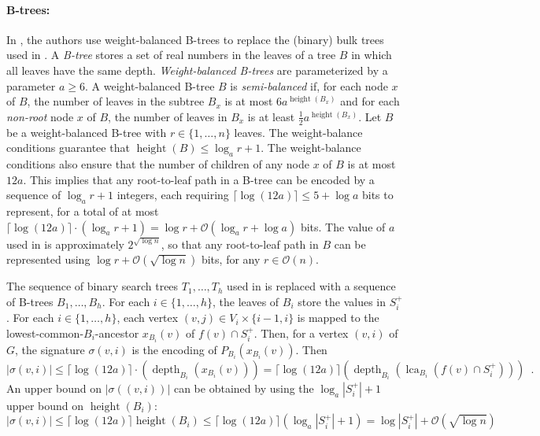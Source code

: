 \documentclass{patmorin}
\renewcommand{\ge}{\geqslant}
\renewcommand{\le}{\leqslant}
\newcommand{\pat}[1]{\noindent\textcolor{Magenta}{PaMo: #1}}
\newcommand{\defin}[1]{\emph{\textcolor{brightmaroon}{#1}}}
\DeclareMathOperator{\height}{height}
\DeclareMathOperator{\depth}{depth}
\DeclareMathOperator{\lca}{lca}
\newcommand{\Oh}{\mathcal{O}}
\begin{document}
  \paragraph{B-trees:} 
  In \cite{gawrychowski.janczewski:simpler}, the authors use weight-balanced B-trees to replace the (binary) bulk trees used in \cite{dujmovic.esperet.ea:adjacency}.
  A \defin{B-tree} stores a set of real numbers in the leaves of a tree $B$ in which all leaves have the same depth.
  \defin{Weight-balanced B-trees} are parameterized by a parameter $a\ge 6$.  A weight-balanced B-tree $B$ is \defin{semi-balanced} if, for each node $x$ of $B$, the number of leaves in the subtree $B_x$ is at most $6a^{\height(B_x)}$ and for each \emph{non-root} node $x$ of $B$, the number of leaves in $B_x$ is at least $\tfrac{1}{2}a^{\height(B_x)}$.
  Let $B$ be a weight-balanced B-tree with $r\in \{1,\ldots,n\}$ leaves.  The weight-balance conditions guarantee that $\height(B)\le \log_a r + 1$.
  The weight-balance conditions also ensure that the number of children of any node $x$ of $B$ is at most $12a$.
  This implies that any root-to-leaf path in a B-tree can be encoded by a sequence of $\log_a r+1$ integers, each requiring $\lceil\log(12a)\rceil\le 5+\log a$ bits to represent, for a total of at most $\lceil\log(12a)\rceil\cdot(\log_a r+1)=\log r + \Oh(\log_a r + \log a)$ bits.
  The value of $a$ used in \cite{gawrychowski.janczewski:simpler} is approximately $2^{\sqrt{\log n}}$, so that any root-to-leaf path in $B$ can be represented using $\log r + \Oh(\sqrt{\log n})$ bits, for any $r\in\Oh(n)$.


  The sequence of binary search trees $T_1,\ldots,T_h$ used in \cite{gawrychowski.janczewski:simpler} is replaced with a sequence of B-trees $B_1,\ldots,B_h$.
  For each $i\in\{1,\ldots,h\}$, the leaves of $B_i$ store the values in $S^+_i$.
  For each $i\in\{1,\ldots,h\}$, each vertex $(v,j)\in V_i\times\{i-1,i\}$ is mapped to the lowest-common-$B_i$-ancestor $x_{B_i}(v)$ of $f(v)\cap S^+_i$.
  Then, for a vertex $(v,i)$ of $G$, the signature \defin{$\sigma(v,i)$} is the encoding of $P_{B_i}(x_{B_i}(v))$.
  Then
  \[
    |\sigma(v,i)| \le \lceil\log (12a)\rceil\cdot(\depth_{B_i}(x_{B_i}(v))) = \lceil\log (12a)\rceil(\depth_{B_i}(\lca_{B_i}(f(v)\cap S_i^+))) \enspace .
  \]
  An upper bound on $|\sigma((v,i))|$ can be obtained by using the $\log_a |S^+_i|+1$ upper bound on $\height(B_i)$:
  \[
    |\sigma(v,i)|\le \lceil\log (12a)\rceil\height(B_i) \le \lceil\log (12a)\rceil(\log_a |S^+_i| + 1)= \log |S^+_i| + \Oh(\sqrt{\log n})
  \]
\end{document}
